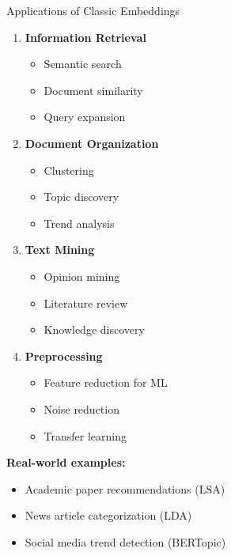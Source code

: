 \documentclass[aspectratio=169]{beamer}
\begin{document}
\begin{frame}[shrink=10]{Applications of Classic Embeddings 🚀}
\begin{enumerate}\setlength{\itemsep}{0pt}
    \item \textbf{Information Retrieval}
    \begin{itemize}\setlength{\itemsep}{0pt}
        \item Semantic search
        \item Document similarity
        \item Query expansion
    \end{itemize}

    \item \textbf{Document Organization}
    \begin{itemize}\setlength{\itemsep}{0pt}
        \item Clustering
        \item Topic discovery
        \item Trend analysis
    \end{itemize}

    \item \textbf{Text Mining}
    \begin{itemize}\setlength{\itemsep}{0pt}
        \item Opinion mining
        \item Literature review
        \item Knowledge discovery
    \end{itemize}

    \item \textbf{Preprocessing}
    \begin{itemize}\setlength{\itemsep}{0pt}
        \item Feature reduction for ML
        \item Noise reduction
        \item Transfer learning
    \end{itemize}
\end{enumerate}

\vspace{0.5em}
\textbf{Real-world examples:}
\begin{itemize}\setlength{\itemsep}{0pt}
    \item Academic paper recommendations (LSA)
    \item News article categorization (LDA)
    \item Social media trend detection (BERTopic)
\end{itemize}
\end{frame}
\end{document}
